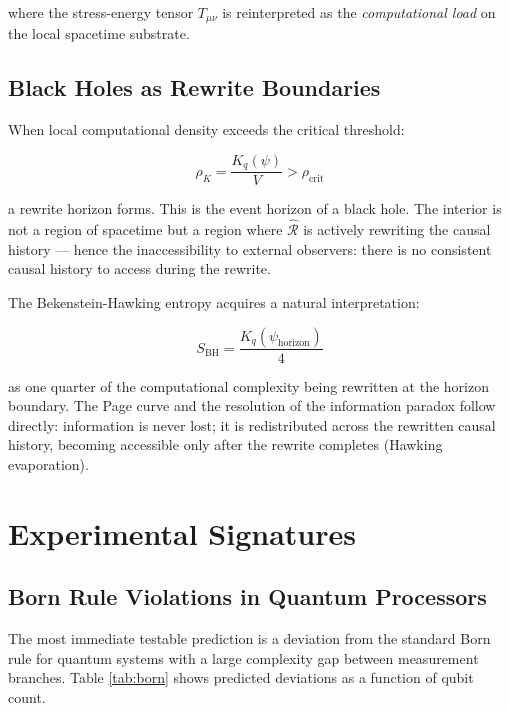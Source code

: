 \documentclass[12pt,a4paper]{article}
\begin{document}
where the stress-energy tensor $T_{\mu\nu}$ is reinterpreted as the \textit{computational load} on the local spacetime substrate.

\subsection{Black Holes as Rewrite Boundaries}

When local computational density exceeds the critical threshold:

\begin{equation}
\rho_K = \frac{K_q(\psi)}{V} > \rho_{\text{crit}}
\end{equation}

a rewrite horizon forms. This is the event horizon of a black hole. The interior is not a region of spacetime but a region where $\hat{\mathcal{R}}$ is actively rewriting the causal history — hence the inaccessibility to external observers: there is no consistent causal history to access during the rewrite.

The Bekenstein-Hawking entropy acquires a natural interpretation:

\begin{equation}
S_{\text{BH}} = \frac{K_q(\psi_{\text{horizon}})}{4}
\end{equation}

as one quarter of the computational complexity being rewritten at the horizon boundary. The Page curve and the resolution of the information paradox follow directly: information is never lost; it is redistributed across the rewritten causal history, becoming accessible only after the rewrite completes (Hawking evaporation).

\section{Experimental Signatures}

\subsection{Born Rule Violations in Quantum Processors}

The most immediate testable prediction is a deviation from the standard Born rule for quantum systems with a large complexity gap between measurement branches. Table \ref{tab:born} shows predicted deviations as a function of qubit count.
\end{document}
